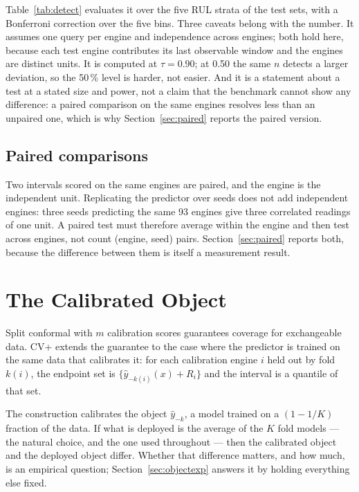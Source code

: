 \documentclass[journal]{IEEEtran}
\begin{document}
Table~\ref{tab:detect} evaluates it over the five RUL strata of the test sets, with a
Bonferroni correction over the five bins. Three caveats belong with the number. It assumes
one query per engine and independence across engines; both hold here, because each test
engine contributes its last observable window and the engines are distinct units. It is
computed at $\tau=0.90$; at 0.50 the same $n$ detects a larger deviation, so the 50\,\% level
is harder, not easier. And it is a statement about a test at a stated size and power, not a
claim that the benchmark cannot show any difference: a paired comparison on the same engines
resolves less than an unpaired one, which is why Section~\ref{sec:paired} reports the paired
version.

\subsection{Paired comparisons}

Two intervals scored on the same engines are paired, and the engine is the independent unit.
Replicating the predictor over seeds does not add independent engines: three seeds predicting
the same 93 engines give three correlated readings of one unit. A paired test must therefore
average within the engine and then test across engines, not count (engine, seed) pairs.
Section~\ref{sec:paired} reports both, because the difference between them is itself a
measurement result.

\section{The Calibrated Object}\label{sec:object}

Split conformal \cite{vovk2005} with $m$ calibration scores guarantees coverage for
exchangeable data. CV+ \cite{barber2021} extends the guarantee to the case where the
predictor is trained on the same data that calibrates it: for each calibration engine $i$
held out by fold $k(i)$, the endpoint set is $\{\hat y_{-k(i)}(x)+R_i\}$ and the interval is a
quantile of that set.

The construction calibrates the object $\hat y_{-k}$, a model trained on a $(1-1/K)$ fraction
of the data. If what is deployed is the average of the $K$ fold models --- the natural choice,
and the one used throughout --- then the calibrated object and the deployed object differ.
Whether that difference matters, and how much, is an empirical question;
Section~\ref{sec:objectexp} answers it by holding everything else fixed.
\end{document}
